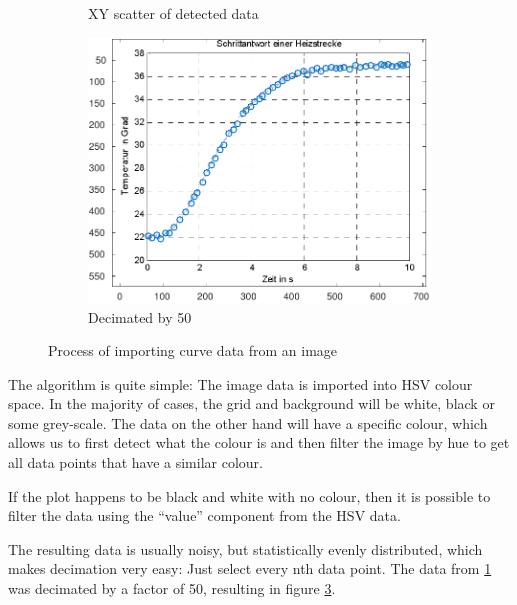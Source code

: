 \begin{figure}
\begin{subfigure}{.3\textwidth}
        \caption{XY scatter of detected data}
        \label{fig:image:scatter_raw}
    \end{subfigure}
    \begin{subfigure}{.3\textwidth}
        \includegraphics[width=.95\linewidth]{images/scatter_decimated_50}
        \caption{Decimated by 50}
        \label{fig:image:scatter_dec}
    \end{subfigure}
    \caption{Process of importing curve data from an image}
\end{figure}

The algorithm is quite simple: The image data is imported into HSV colour space.
In  the majority of cases, the grid and background will be white, black or  some
grey-scale. The data on the other hand will have a specific colour, which allows
us to first detect  what  the  colour is and then filter the image by hue to get
all data points that have a similar colour.

If the plot happens to be black and white with no colour, then it is possible to
filter  the  data  using  the   ``value''   component   from   the   HSV   data.

The resulting data is usually noisy, but statistically evenly distributed, which
makes  decimation  very easy: Just select every nth data point.  The  data  from
\ref{fig:image:scatter_raw} was decimated by a factor of 50, resulting in figure
\ref{fig:image:scatter_dec}.

